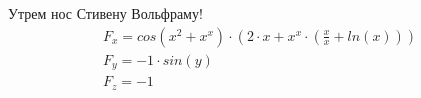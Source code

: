 \documentclass{article}
\begin{document}
\par Утрем нос Стивену Вольфраму!
\begin{gather*}
F_{x} = cos\left(x ^ {2} + x ^ {x}\right) \cdot \left(2 \cdot x + x ^ {x} \cdot \left( \frac {x} {x} + ln\left(x\right)\right)\right)\\
F_{y} = -1 \cdot sin\left(y\right)\\
F_{z} = -1\\
\end{gather*}
\end{document}
